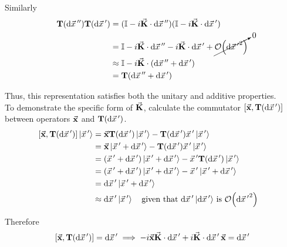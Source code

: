 \documentclass[12pt,a4paper,titlepage]{article}
\begin{document}
Similarly
\begin{equation}
\begin{aligned}
\vb{T}(\dd{\vec{x}\,''})\vb{T}(\dd{\vec{x}\,'})&=(\mathbb{I}-i\vec{\vb{K}}\cdot\dd{\vec{x}\,''})(\mathbb{I}-i\vec{\vb{K}}\cdot\dd{\vec{x}\,'})\\
&=\mathbb{I}-i\vec{\vb{K}}\cdot\dd{\vec{x}\,''}-i\vec{\vb{K}}\cdot\dd{\vec{x}\,'}+\cancelto{0}{\order{\dd{\vec{x}\,'}^{2}}}\\
&\approx\mathbb{I}-i\vec{\vb{K}}\cdot(\dd{\vec{x}\,''}+\dd{\vec{x}\,'})\\
&=\vb{T}(\dd{\vec{x}\,''}+\dd{\vec{x}\,'})
\end{aligned}
\end{equation}

Thus, this representation satisfies both the unitary and additive properties.\\

To demonstrate the specific form of $\vec{\vb{K}}$, calculate the commutator $\comm{\vec{\vb{x}}}{\vb{T}(\dd{\vec{x}\,'})}$ between operators $\vec{\vb{x}}$ and $\vb{T}(\dd{\vec{x}\,'})$.
\begin{equation}
\begin{aligned}
\comm{\vec{\vb{x}}}{\vb{T}(\dd{\vec{x}\,'})}\ket*{\vec{x}\,'}&=\vec{\vb{x}}\vb{T}(\dd{\vec{x}\,'})\ket*{\vec{x}\,'}-\vb{T}(\dd{\vec{x}\,'})\vec{x}\,'\ket*{\vec{x}\,'}\\
&=\vec{\vb{x}}\ket*{\vec{x}\,'+\dd{\vec{x}\,'}}-\vb{T}(\dd{\vec{x}\,'})\vec{x}\,'\ket*{\vec{x}\,'}\\
&=(\vec{x}\,'+\dd{\vec{x}\,'})\ket*{\vec{x}\,'+\dd{\vec{x}\,'}}-\vec{x}\,'\vb{T}(\dd{\vec{x}\,'})\ket*{\vec{x}\,'}\\
&=(\vec{x}\,'+\dd{\vec{x}\,'})\ket*{\vec{x}\,'+\dd{\vec{x}\,'}}-\vec{x}\,'\ket*{\vec{x}\,'+\dd{\vec{x}\,'}}\\
&=\dd\vec{x}\,'\ket*{\vec{x}\,'+\dd{\vec{x}\,'}}\\
&\approx\dd\vec{x}\,'\ket*{\vec{x}\,'}\qq{given that $\dd\vec{x}\,'\ket*{\dd{\vec{x}\,'}}$ is $\order{\dd{\vec{x}\,'}^{2}}$}
\end{aligned}
\end{equation}

Therefore
\begin{equation}
\comm{\vec{\vb{x}}}{\vb{T}(\dd{\vec{x}\,'})}=\dd{\vec{x}\,'}\implies -i\vec{\vb{x}}\vec{\vb{K}}\cdot\dd{\vec{x}\,'}+i\vec{\vb{K}}\cdot\dd{\vec{x}\,'}\vec{\vb{x}}=\dd{\vec{x}\,'}
\end{equation}
\end{document}
